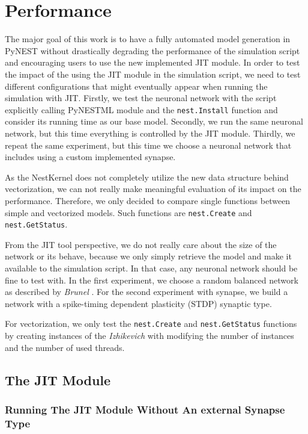 \chapter{Performance}
 \label{chap:perf}
 
 The major goal of this work is to have a fully automated model generation in PyNEST without drastically degrading the performance of the simulation script and encouraging users to use the new implemented JIT module. In order to test the impact of the using the JIT module in the simulation script, we need to test different configurations that might eventually appear when running the simulation with JIT. Firstly, we test the neuronal network with the script explicitly calling PyNESTML module and the \texttt{nest.Install} function and  consider its running time as our base model. Secondly, we run the same neuronal network, but this time everything is controlled by the JIT module. Thirdly, we repeat the same experiment, but this time we choose a neuronal network that includes using a custom implemented synapse.
 
 As the NestKernel does not completely utilize the new data structure behind vectorization, we can not really make meaningful evaluation of its impact on the performance. Therefore, we only decided to compare single functions between simple and vectorized models. Such functions are \texttt{nest.Create} and \texttt{nest.GetStatus}.
 
 From the JIT tool perspective, we do not really care about the size of the network or its behave, because we only simply retrieve the model and make it available to the simulation script. In that case, any neuronal network should be fine to test with. In the first experiment, we choose a random balanced network as  described by \emph{Brunel} \citep{brunel2000dynamics}. For the second experiment with synapse, we build a network with a spike-timing dependent plasticity (STDP) synaptic type.
 
 
 For vectorization, we only test the \texttt{nest.Create} and \texttt{nest.GetStatus} functions by creating instances of the \emph{Izhikevich} \citep{1257420} with modifying the number of instances and the number of used threads.
 
\section{The JIT Module}

\subsection*{Running The JIT Module Without An external Synapse Type}

